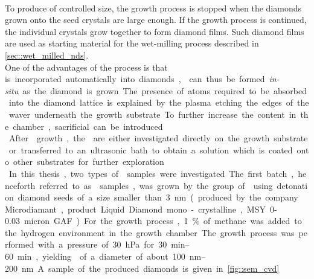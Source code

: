 	\\
	To produce \nds of controlled size, the growth process is stopped when the diamonds grown onto the seed crystals are large enough.
	If the growth process is continued, the individual crystals grow together to form diamond films.
	Such diamond films are used as starting material for the wet-milling process described in \autoref{sec::wet_milled_nds}.
	\\
	One of the advantages of the \CVD process is that \si is incorporated automatically into diamonds, \sivs can thus be formed \textit{in-situ} as the diamond is grown. The presence of \si atoms required to be absorbed into the diamond lattice is explained by the plasma etching the edges of the \si waver underneath the growth substrate.
	To further increase the \si content in the chamber, sacrificial \si can be introduced.
	\\
	After \nd growth, the \nds are either investigated directly on the growth substrate or transferred to an ultrasonic bath to obtain a solution which is coated onto other substrates for further exploration.
	\\
	In this thesis, two types of \nds samples were investigated.
	The first batch, henceforth referred to as \CVD samples, was grown by the group of \schreck using detonation diamond seeds of a size smaller than \SI{3}{nm}(produced by the company Microdiamant, product Liquid Diamond mono-crystalline, MSY {0-0.03} micron GAF).
	For the growth process, \SI{1}{\percent} of methane was added to the hydrogen environment in the growth chamber.
	The growth process was performed with a pressure of \SI{30}{hPa} for \SIrange{30}{60}{min}, yielding \nds of a diameter of about \SIrange{100}{200}{nm}. A sample of the produced diamonds is given in \autoref{fig::sem_cvd}.
	\\

